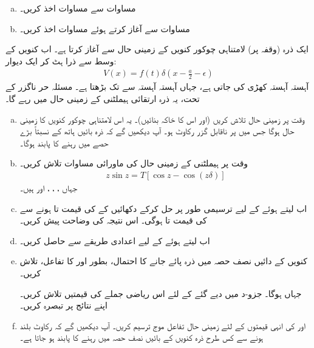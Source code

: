 \begin{enumerate}[a.]
\item
مساوات  سے مساوات  اخذ کریں۔
\item
مساوات  سے آغاز کرتے ہوئے مساوات  اخذ کریں۔
\end{enumerate}


ایک ذرہ (وقفہ  پر) لامتناہی چوکور کنویں کے زمینی حال سے آغاز کرتا ہے۔ اب کنویں کے وسط سے ذرا ہٹ کر ایک دیوار:
\begin{align*}
V (x) = f (t) \delta (x - \frac{a}{2} - \epsilon)
\end{align*}
 آہستہ آہستہ کھڑی کی جاتی ہے، جہاں  آہستہ آہستہ سے  تک بڑھتا ہے۔ مسئلہ حر ناگزر کے تحت، یہ ذرہ ارتقائی ہیملٹنی کے زمینی حال میں رہے گا۔ 
\begin{enumerate}[a.]
\item
وقت  پر زمینی حال تلاش کریں (اور اس کا خاکہ بنائیں)۔  یہ اس لامتناہی چوکور کنویں کا زمینی حال ہوگا جس میں  پر ناقابل گزر رکاوٹ ہو۔ آپ دیکھیں گے کہ ذرہ بائیں ہاتھ کے نسبتاً بڑے حصے میں رہنے کا پابند ہوگا۔ 
\item
وقت  پر ہیملٹنی کے زمینی حال کی ماورائی مساوات تلاش کریں۔  
\begin{align*}
z \sin z = T [\cos z - \cos (z \delta)]
\end{align*}
جہاں ، ، ، اور  ہیں۔ 
\item
اب  لیتے ہوئے  کے لیے ترسیمی طور پر حل کرکے دکھائیں کے  کی قیمت  تا  ہونے سے  کی قیمت  تا  ہوگی۔ اس نتیجہ کی وضاحت پیش کریں۔
\item 
اب  لیتے ہوئے  کے لیے اعدادی طریقے سے  حاصل کریں۔ 
\item
کنویں کے دائیں نصف حصہ میں ذرہ پائے جانے کا احتمال، بطور  اور  کا تفاعل، تلاش کریں۔ 

جہاں  ہوگا۔ جزو-د میں دیے گئے  کے لئے اس ریاضی جملے کی قیمتیں تلاش کریں۔ اپنے نتائج پر تبصرہ کریں۔ 
\item
{} اور  کی انہی قیمتوں کے لئے زمینی حال تفاعل موج ترسیم کریں۔ آپ دیکھیں گے کہ رکاوٹ بلند ہونے سے کس طرح ذرہ کنویں کے بائیں نصف حصہ میں رہنے کا پابند ہو جاتا ہے۔ 
\end{enumerate}
